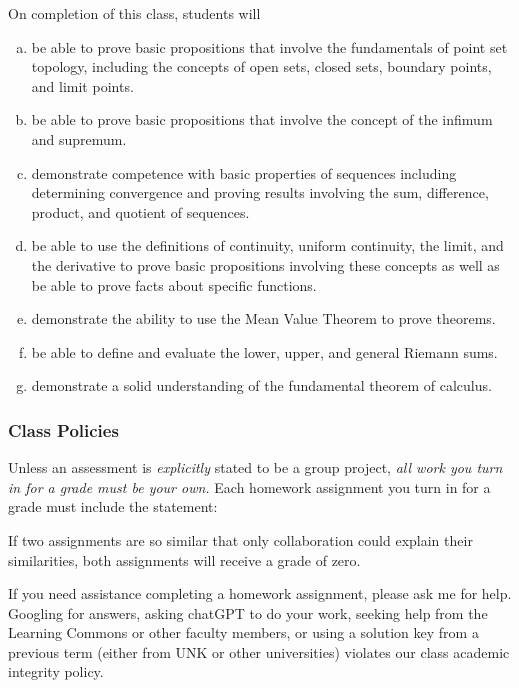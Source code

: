 \documentclass[12pt]{article}
\newcounter{ex}\setcounter{ex}{0}
\newenvironment{alphalist}{
  \begin{enumerate}[(a)]
    \addtolength{\itemsep}{-0.5\itemsep}}
  {\end{enumerate}}
\begin{document}
On completion of this class, students will
\begin{alphalist}
    \item be able to prove basic propositions that involve the fundamentals of point set topology, including the concepts of open sets, closed sets, boundary points, and limit points.
     \item be able to prove basic propositions that involve the concept of the infimum and supremum. 
    \item demonstrate competence with basic properties of sequences including determining convergence and proving results involving the sum, difference, product, and quotient of sequences.
    \item be able to use the definitions of continuity, uniform continuity, the limit, and the derivative to prove basic propositions involving these concepts as well as be able to prove facts about specific functions.
    \item demonstrate the ability to use the Mean Value Theorem to prove theorems. 
    \item be able to define and evaluate the lower, upper, and general Riemann sums.
    \item demonstrate a solid understanding of the fundamental theorem of calculus.
\end{alphalist}

\subsubsection* {Class Policies}

Unless an assessment is \emph{explicitly} stated to be a group project,  
\emph{all work you turn in for a grade must be your own.}  Each homework assignment you turn in for a grade must 
include the statement:

\begin{quote}
\end{quote}
 If two assignments are so similar that only collaboration could explain their 
 similarities, both assignments will receive a grade of zero.  

 If  you need assistance completing a homework assignment, please ask 
 me for help. Googling for answers, asking chatGPT to do your work, seeking help 
from the Learning Commons or other faculty members, or using a solution 
key from a previous term (either from UNK or other universities) 
violates our class academic integrity policy.
\end{document}
